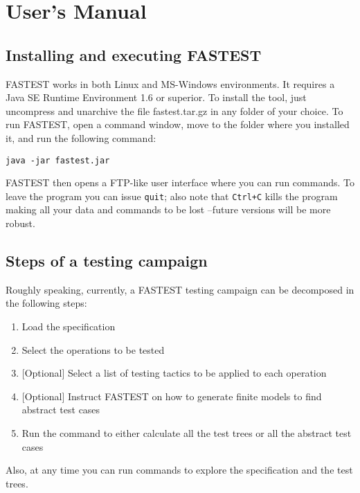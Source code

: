 \section{User's Manual}

\subsection{Installing and executing FASTEST}

FASTEST works in both Linux and MS-Windows environments. It requires a Java SE Runtime Environment 1.6 or superior. To install the tool, just uncompress and unarchive the file fastest.tar.gz in any folder of your choice. To run FASTEST, open a command window, move to the folder where you installed it, and run the following command:

\begin{verbatim}
java -jar fastest.jar
\end{verbatim}

FASTEST then opens a FTP-like user interface where you can run commands. To leave the program you can issue \verb+quit+; also note that \verb!Ctrl+C! kills the program making all your data and commands to be lost --future versions will be more robust.

\subsection{Steps of a testing campaign}

Roughly speaking, currently, a FASTEST testing campaign can be decomposed in the following steps:

\begin{enumerate}
\item Load the specification 

\item Select the operations to be tested

\item\mbox{} [Optional] Select a list of testing tactics to be applied to each operation

\item\mbox{} [Optional] Instruct FASTEST on how to generate finite models to find abstract test cases

\item Run the command to either calculate all the test trees or all the abstract test cases
\end{enumerate} 

Also, at any time you can run commands to explore the specification and the test trees. 

